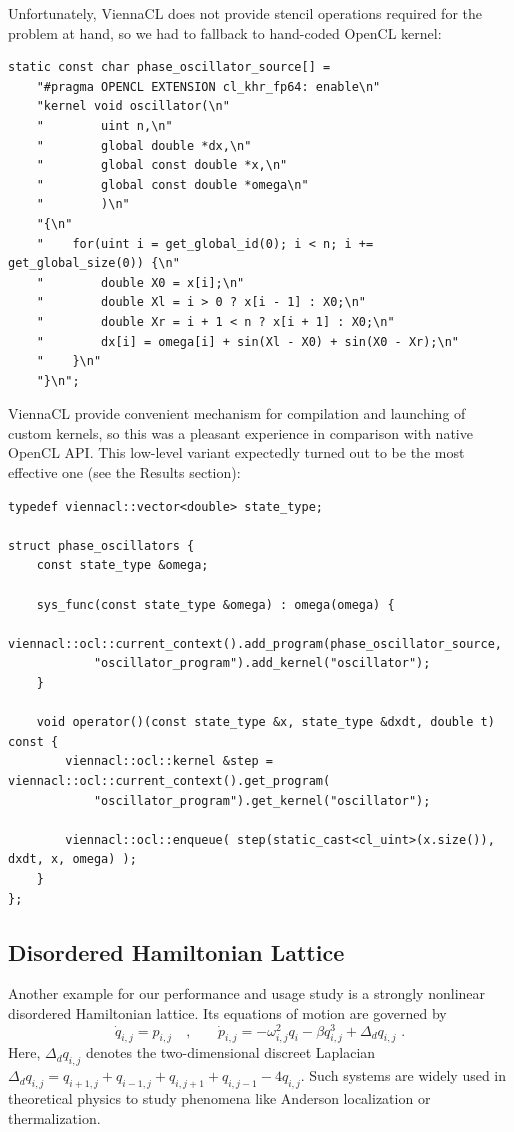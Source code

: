 \documentclass[1p]{elsarticle}
\begin{document}
Unfortunately, ViennaCL does not provide stencil operations required for
the problem at hand, so we had to fallback to hand-coded OpenCL kernel:
\begin{lstlisting}
static const char phase_oscillator_source[] =
    "#pragma OPENCL EXTENSION cl_khr_fp64: enable\n"
    "kernel void oscillator(\n"
    "        uint n,\n"
    "        global double *dx,\n"
    "        global const double *x,\n"
    "        global const double *omega\n"
    "        )\n"
    "{\n"
    "    for(uint i = get_global_id(0); i < n; i += get_global_size(0)) {\n"
    "        double X0 = x[i];\n"
    "        double Xl = i > 0 ? x[i - 1] : X0;\n"
    "        double Xr = i + 1 < n ? x[i + 1] : X0;\n"
    "        dx[i] = omega[i] + sin(Xl - X0) + sin(X0 - Xr);\n"
    "    }\n"
    "}\n";
\end{lstlisting}
ViennaCL provide convenient mechanism for compilation and launching of custom
kernels, so this was a pleasant experience in comparison with native OpenCL
API. This low-level variant expectedly turned out to be the most effective one
(see the Results section):
\begin{lstlisting}[firstnumber=last]
typedef viennacl::vector<double> state_type;

struct phase_oscillators {
    const state_type &omega;

    sys_func(const state_type &omega) : omega(omega) {
        viennacl::ocl::current_context().add_program(phase_oscillator_source,
            "oscillator_program").add_kernel("oscillator");
    }

    void operator()(const state_type &x, state_type &dxdt, double t) const {
        viennacl::ocl::kernel &step = viennacl::ocl::current_context().get_program(
            "oscillator_program").get_kernel("oscillator");

        viennacl::ocl::enqueue( step(static_cast<cl_uint>(x.size()), dxdt, x, omega) );
    }
};
\end{lstlisting}








%
%
\subsection{Disordered Hamiltonian Lattice}


Another example for our performance and usage study is a strongly
nonlinear disordered Hamiltonian lattice. Its equations of motion are
governed by
\begin{equation}
\dot{q}_{i,j} = p_{i,j}
\quad \text{,} \quad \quad 
\dot{p}_{i,j} = - \omega_{i,j}^2 q_i - \beta q_{i,j}^3 + \Delta_d q_{i,j}
\,\,\text{.}
\label{eq:disordered_ham}
\end{equation}
Here, $\Delta_d q_{i,j}$ denotes the two-dimensional discreet Laplacian
$\Delta_d
q_{i,j}=q_{i+1,j}+q_{i-1,j}+q_{i,j+1}+q_{i,j-1}-4q_{i,j}$. Such
systems are widely used in theoretical physics to study phenomena
like Anderson localization or thermalization.
\end{document}
